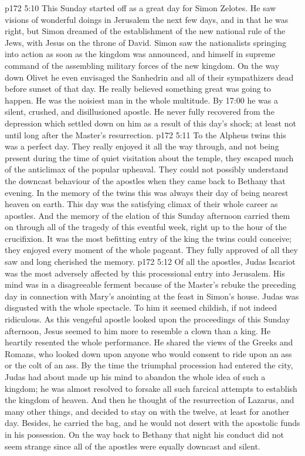 \vs p172 5:10 This Sunday started off as a great day for Simon Zelotes. He saw visions of wonderful doings in Jerusalem the next few days, and in that he was right, but Simon dreamed of the establishment of the new national rule of the Jews, with Jesus on the throne of David. Simon saw the nationalists springing into action as soon as the kingdom was announced, and himself in supreme command of the assembling military forces of the new kingdom. On the way down Olivet he even envisaged the Sanhedrin and all of their sympathizers dead before sunset of that day. He really believed something great was going to happen. He was the noisiest man in the whole multitude. By 17:00 he was a silent, crushed, and disillusioned apostle. He never fully recovered from the depression which settled down on him as a result of this day’s shock; at least not until long after the Master’s resurrection.
\vs p172 5:11 To the Alpheus twins this was a perfect day. They really enjoyed it all the way through, and not being present during the time of quiet visitation about the temple, they escaped much of the anticlimax of the popular upheaval. They could not possibly understand the downcast behaviour of the apostles when they came back to Bethany that evening. In the memory of the twins this was always their day of being nearest heaven on earth. This day was the satisfying climax of their whole career as apostles. And the memory of the elation of this Sunday afternoon carried them on through all of the tragedy of this eventful week, right up to the hour of the crucifixion. It was the most befitting entry of the king the twins could conceive; they enjoyed every moment of the whole pageant. They fully approved of all they saw and long cherished the memory.
\vs p172 5:12 Of all the apostles, Judas Iscariot was the most adversely affected by this processional entry into Jerusalem. His mind was in a disagreeable ferment because of the Master’s rebuke the preceding day in connection with Mary’s anointing at the feast in Simon’s house. Judas was disgusted with the whole spectacle. To him it seemed childish, if not indeed ridiculous. As this vengeful apostle looked upon the proceedings of this Sunday afternoon, Jesus seemed to him more to resemble a clown than a king. He heartily resented the whole performance. He shared the views of the Greeks and Romans, who looked down upon anyone who would consent to ride upon an ass or the colt of an ass. By the time the triumphal procession had entered the city, Judas had about made up his mind to abandon the whole idea of such a kingdom; he was almost resolved to forsake all such farcical attempts to establish the kingdom of heaven. And then he thought of the resurrection of Lazarus, and many other things, and decided to stay on with the twelve, at least for another day. Besides, he carried the bag, and he would not desert with the apostolic funds in his possession. On the way back to Bethany that night his conduct did not seem strange since all of the apostles were equally downcast and silent.
